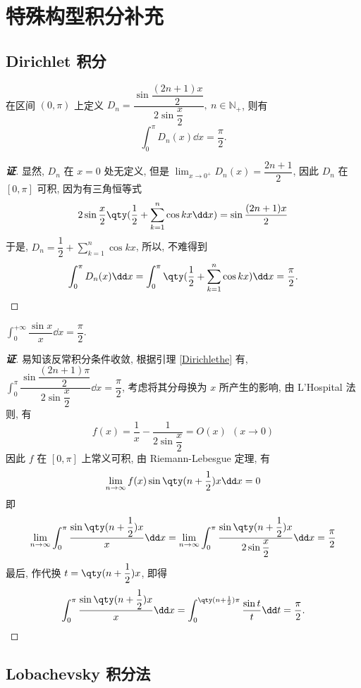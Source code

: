 \section{特殊构型积分补充}

\subsection{Dirichlet 积分}

\begin{lemma}[Dirichlet 核]
    \label{Dirichlethe}
    在区间 $(0,\pi)$ 上定义 $D_n=\dfrac{\sin\dfrac{(2n+1)x}{2}}{2\sin\dfrac{x}{2}},~n\in\mathbb{N}_+$, 则有 $$\int_{0}^{\pi}D_n(x)\dd x=\dfrac{\pi}{2}.$$
\end{lemma}
\begin{proof}[{\songti \textbf{证}}]
    显然, $D_n$ 在 $x=0$ 处无定义, 但是 $\displaystyle\lim_{x\to0^+}D_n(x)=\dfrac{2n+1}{2}$, 因此 $D_n$ 在 $[0,\pi]$ 可积, 因为有三角恒等式
    $$2\sin\dfrac{x}{2}\qty(\dfrac{1}{2}+\sum_{k=1}^{n}\cos kx\dd x)=\sin\dfrac{(2n+1)x}{2}$$
    于是, $\displaystyle D_n=\dfrac{1}{2}+\sum_{k=1}^{n}\cos kx$, 所以, 不难得到
    $$\int_{0}^{\pi}D_n(x)\dd x=\int_{0}^{\pi}\qty(\dfrac{1}{2}+\sum_{k=1}^{n}\cos kx)\dd x=\dfrac{\pi}{2}.$$
\end{proof}

\begin{theorem}
    $\displaystyle\int_{0}^{+\infty}\dfrac{\sin x}{x}\dd x=\dfrac{\pi}{2}.$
\end{theorem}
\begin{proof}[{\songti \textbf{证}}]
    易知该反常积分条件收敛, 根据引理 \ref{Dirichlethe} 有, $\displaystyle\int_{0}^{\pi}\dfrac{\sin\dfrac{(2n+1)\pi}{2}}{2\sin\dfrac{x}{2}}\dd x=\dfrac{\pi}{2}$, 考虑将其分母换为 $x$ 所产生的影响, 
    由 L'Hospital 法则, 有 $$f(x)=\dfrac{1}{x}-\dfrac{1}{2\sin\dfrac{x}{2}}=O(x)~~ (x\to0)$$
    因此 $f$ 在 $[0,\pi]$ 上常义可积, 由 Riemann-Lebesgue 定理, 有
    $$\lim_{n\to\infty}f(x)\sin\qty(n+\dfrac{1}{2})x\dd x=0$$
    即 $$\lim_{n\to\infty}\int_{0}^{\pi}\dfrac{\sin\qty(n+\dfrac{1}{2})x}{x}\dd x=\lim_{n\to\infty}\int_{0}^{\pi}\dfrac{\sin\qty(n+\dfrac{1}{2})x}{2\sin\dfrac{x}{2}}\dd x=\dfrac{\pi}{2}$$
    最后, 作代换 $t=\qty(n+\dfrac{1}{2})x$, 即得 $$\int_{0}^{\pi}\dfrac{\sin\qty(n+\dfrac{1}{2})x}{x}\dd x=\int_{0}^{\qty(n+\frac{1}{2})\pi}\dfrac{\sin t}{t}\dd t=\dfrac{\pi}{2}.$$
\end{proof}

\subsection{Lobachevsky 积分法}


